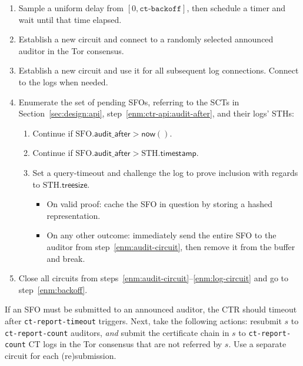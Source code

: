 \begin{enumerate}
	\item\label{enm:backoff} Sample a uniform delay from
			$[0, \texttt{ct-backoff}]$,
		then schedule a timer and wait until that time elapsed.
	\item\label{enm:audit-circuit} Establish a new circuit and connect to a
		randomly selected announced auditor in the Tor consensus.
	\item\label{enm:log-circuit} Establish a new circuit and use it for all
		subsequent log connections.  Connect to the logs when needed.
	\item\label{enm:audit-loop} Enumerate the set of pending SFOs, referring to
		the SCTs in Section~\ref{sec:design:api},
		step~\ref{enm:ctr-api:audit-after}, and their logs' STHs:
		\begin{enumerate}
			\item\label{enm:audit-loop:wait-sct} Continue if
				$\textrm{SFO}.\mathsf{audit\_after} > \mathsf{now}()$.
			\item\label{enm:audit-loop:wait-sth} Continue if
				$\textrm{SFO}.\mathsf{audit\_after} >
				\textrm{STH}.\mathsf{timestamp}$.
			\item\label{enm:audit-loop:challenge} Set a query-timeout and
				challenge the log to prove inclusion with regards to
				$\textrm{STH}.\mathsf{treesize}$.
				\begin{itemize}
					\item\label{enm:audit-loop:challenge:success} On valid
						proof: cache the SFO in question by storing a hashed
						representation.
					\item\label{enm:audit-loop:challenge:fail} On any other
						outcome: immediately send the entire SFO to the auditor
						from step~\ref{enm:audit-circuit}, then remove it from
						the buffer and break.
				\end{itemize}
		\end{enumerate}
	\item\label{enm:teardown} Close all circuits from
		steps~\ref{enm:audit-circuit}--\ref{enm:log-circuit} and go to
		step~\ref{enm:backoff}.
\end{enumerate}

If an SFO must be submitted to an announced auditor, the CTR should timeout
after \texttt{ct-report-timeout} triggers.  Next, take the following actions:
	resubmit $s$ to \texttt{ct-report-count} auditors, \emph{and}
	submit the certificate chain in $s$ to \texttt{ct-report-count} CT logs
		in the Tor consensus that are not referred by $s$.
Use a separate circuit for each (re)submission.

